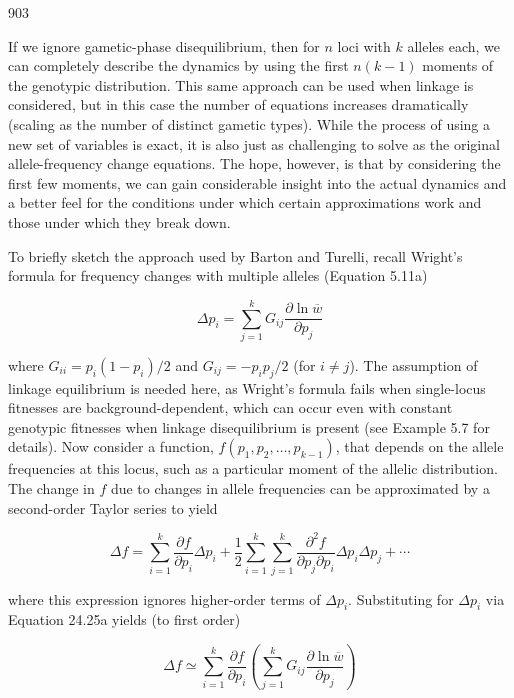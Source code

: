 \documentclass{article}
\begin{document}
903

If we ignore gametic-phase disequilibrium, then for $n$ loci with $k$ alleles each, we can completely describe the dynamics by using the first $n(k-1)$ moments of the genotypic distribution. This same approach can be used when linkage is considered, but in this case the number of equations increases dramatically (scaling as the number of distinct gametic types). While the process of using a new set of variables is exact, it is also just as challenging to solve as the original allele-frequency change equations. The hope, however, is that by considering the first few moments, we can gain considerable insight into the actual dynamics and a better feel for the conditions under which certain approximations work and those under which they break down.

To briefly sketch the approach used by Barton and Turelli, recall Wright’s formula for frequency changes with multiple alleles (Equation 5.11a)

\begin{equation}
\Delta p_{i}=\sum_{j=1}^{k}G_{ij}\frac{\partial\ln\overline{w}}{\partial p_{j}}
\tag{24.25a}
\label{eq:24_25a}
\end{equation}

where  $ G_{ii} = p_i(1 - p_i)/2 $ and  $ G_{ij} = -p_i p_j/2 $ (for  $ i \neq j $). The assumption of linkage equilibrium is needed here, as Wright's formula fails when single-locus fitnesses are background-dependent, which can occur even with constant genotypic fitnesses when linkage disequilibrium is present (see Example 5.7 for details). Now consider a function,  $ f(p_1, p_2, \ldots, p_{k-1}) $, that depends on the allele frequencies at this locus, such as a particular moment of the allelic distribution. The change in  $ f $ due to changes in allele frequencies can be approximated by a second-order Taylor series to yield

\begin{equation}
\Delta f=\sum_{i=1}^{k}\frac{\partial f}{\partial p_{i}}\Delta p_{i}+\frac{1}{2}\sum_{i=1}^{k}\sum_{j=1}^{k}\frac{\partial^{2}f}{\partial p_{j}\partial p_{i}}\Delta p_{i}\Delta p_{j}+\cdots
\tag{24.25b}
\label{eq:24_25b}
\end{equation}

where this expression ignores higher-order terms of  $ \Delta p_{i} $. Substituting for  $ \Delta p_{i} $ via Equation 24.25a yields (to first order)

\begin{equation}
\Delta f\simeq\sum_{i=1}^{k}\frac{\partial f}{\partial p_{i}}\left(\sum_{j=1}^{k}G_{ij}\frac{\partial\ln\overline{w}}{\partial p_{j}}\right)
\tag{24.25c}
\label{eq:24_25c}
\end{equation}
\end{document}
